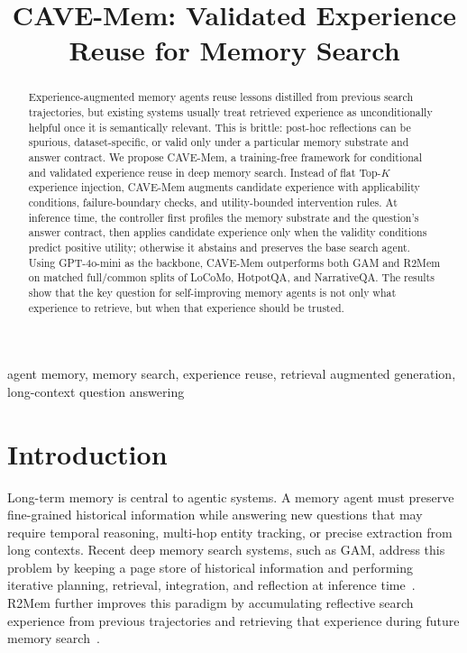 \documentclass[conference]{IEEEtran}
\newcommand{\method}{CAVE-Mem}
\begin{document}
\title{CAVE-Mem: Validated Experience Reuse for Memory Search}

\author{
}

\maketitle

\begin{abstract}
Experience-augmented memory agents reuse lessons distilled from previous search
trajectories, but existing systems usually treat retrieved experience as
unconditionally helpful once it is semantically relevant. This is brittle:
post-hoc reflections can be spurious, dataset-specific, or valid only under a
particular memory substrate and answer contract. We propose \method{}, a
training-free framework for conditional and validated experience reuse in deep
memory search. Instead of flat Top-$K$ experience injection, \method{} augments
candidate experience with applicability conditions, failure-boundary checks,
and utility-bounded intervention rules. At inference time, the controller first
profiles the memory substrate and the question's answer contract, then applies
candidate experience only when the validity conditions predict positive
utility; otherwise it abstains and preserves the base search agent. Using
GPT-4o-mini as the backbone, \method{} outperforms both GAM and R2Mem on
matched full/common splits of LoCoMo, HotpotQA, and NarrativeQA. The results
show that the key question for self-improving memory agents is not only what
experience to retrieve, but when that experience should be trusted.
\end{abstract}

\begin{IEEEkeywords}
agent memory, memory search, experience reuse, retrieval augmented generation,
long-context question answering
\end{IEEEkeywords}

\section{Introduction}

Long-term memory is central to agentic systems. A memory agent must preserve
fine-grained historical information while answering new questions that may
require temporal reasoning, multi-hop entity tracking, or precise extraction
from long contexts. Recent deep memory search systems, such as GAM, address
this problem by keeping a page store of historical information and performing
iterative planning, retrieval, integration, and reflection at inference
time~\cite{gam}. R2Mem further improves this paradigm by accumulating
reflective search experience from previous trajectories and retrieving that
experience during future memory search~\cite{r2mem}.
\end{document}
